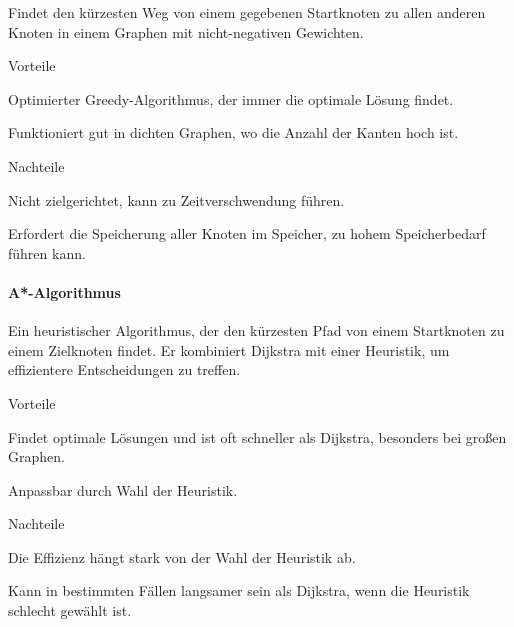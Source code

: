 Findet den kürzesten Weg von einem gegebenen Startknoten zu allen anderen Knoten in einem Graphen mit nicht-negativen Gewichten.

\begin{minipage}[t]{0.48\textwidth}
\begin{items}
  \item [Vorteile]
  \item Optimierter Greedy-Algorithmus, der immer die optimale Lösung findet.
  \item Funktioniert gut in dichten Graphen, wo die Anzahl der Kanten hoch ist.
\end{items}
\end{minipage}
\hfill
\begin{minipage}[t]{0.48\textwidth}
\begin{items}
  \item [Nachteile]
  \item Nicht zielgerichtet, kann zu Zeitverschwendung führen.
  \item Erfordert die Speicherung aller Knoten im Speicher, zu hohem Speicherbedarf führen kann.
\end{items}
\end{minipage}
\paragraph{A*-Algorithmus}

Ein heuristischer Algorithmus, der den kürzesten Pfad von einem Startknoten zu einem Zielknoten findet. Er kombiniert Dijkstra mit einer Heuristik, um effizientere Entscheidungen zu treffen.

\begin{minipage}[t]{0.48\textwidth}
\begin{items}
  \item [Vorteile]
  \item Findet optimale Lösungen und ist oft schneller als Dijkstra, besonders bei großen Graphen.
  \item Anpassbar durch Wahl der Heuristik.
\end{items}
\end{minipage}
\hfill
\begin{minipage}[t]{0.48\textwidth}
\begin{items}
  \item [Nachteile]
  \item Die Effizienz hängt stark von der Wahl der Heuristik ab.
  \item Kann in bestimmten Fällen langsamer sein als Dijkstra, wenn die Heuristik schlecht gewählt ist.
\end{items}
\end{minipage}

